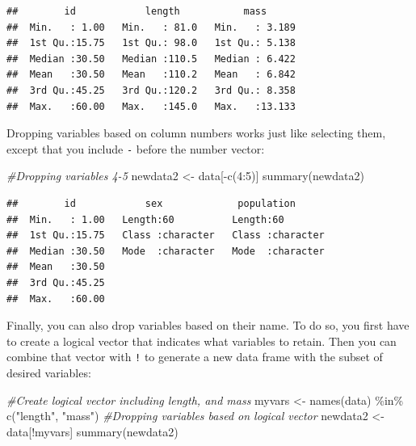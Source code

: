 \documentclass[
]{book}
\newenvironment{Shaded}{\begin{snugshade}}{\end{snugshade}}
\newcommand{\CommentTok}[1]{\textcolor[rgb]{0.56,0.35,0.01}{\textit{#1}}}
\newcommand{\DecValTok}[1]{\textcolor[rgb]{0.00,0.00,0.81}{#1}}
\newcommand{\FunctionTok}[1]{\textcolor[rgb]{0.00,0.00,0.00}{#1}}
\newcommand{\NormalTok}[1]{#1}
\newcommand{\OtherTok}[1]{\textcolor[rgb]{0.56,0.35,0.01}{#1}}
\newcommand{\SpecialCharTok}[1]{\textcolor[rgb]{0.00,0.00,0.00}{#1}}
\newcommand{\StringTok}[1]{\textcolor[rgb]{0.31,0.60,0.02}{#1}}
\begin{document}
\begin{verbatim}
##        id            length           mass       
##  Min.   : 1.00   Min.   : 81.0   Min.   : 3.189  
##  1st Qu.:15.75   1st Qu.: 98.0   1st Qu.: 5.138  
##  Median :30.50   Median :110.5   Median : 6.422  
##  Mean   :30.50   Mean   :110.2   Mean   : 6.842  
##  3rd Qu.:45.25   3rd Qu.:120.2   3rd Qu.: 8.358  
##  Max.   :60.00   Max.   :145.0   Max.   :13.133
\end{verbatim}

Dropping variables based on column numbers works just like selecting them, except that you include \texttt{-} before the number vector:

\begin{Shaded}
\begin{Highlighting}[]
\CommentTok{\#Dropping variables 4{-}5}
\NormalTok{newdata2 }\OtherTok{\textless{}{-}}\NormalTok{ data[}\SpecialCharTok{{-}}\FunctionTok{c}\NormalTok{(}\DecValTok{4}\SpecialCharTok{:}\DecValTok{5}\NormalTok{)]}
\FunctionTok{summary}\NormalTok{(newdata2)}
\end{Highlighting}
\end{Shaded}

\begin{verbatim}
##        id            sex             population       
##  Min.   : 1.00   Length:60          Length:60         
##  1st Qu.:15.75   Class :character   Class :character  
##  Median :30.50   Mode  :character   Mode  :character  
##  Mean   :30.50                                        
##  3rd Qu.:45.25                                        
##  Max.   :60.00
\end{verbatim}

Finally, you can also drop variables based on their name. To do so, you first have to create a logical vector that indicates what variables to retain. Then you can combine that vector with \texttt{!} to generate a new data frame with the subset of desired variables:

\begin{Shaded}
\begin{Highlighting}[]
\CommentTok{\#Create logical vector including length, and mass}
\NormalTok{myvars }\OtherTok{\textless{}{-}} \FunctionTok{names}\NormalTok{(data) }\SpecialCharTok{\%in\%} \FunctionTok{c}\NormalTok{(}\StringTok{"length"}\NormalTok{, }\StringTok{"mass"}\NormalTok{)}
\CommentTok{\#Dropping variables based on logical vector}
\NormalTok{newdata2 }\OtherTok{\textless{}{-}}\NormalTok{ data[}\SpecialCharTok{!}\NormalTok{myvars]}
\FunctionTok{summary}\NormalTok{(newdata2)}
\end{Highlighting}
\end{Shaded}
\end{document}

